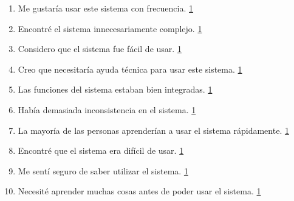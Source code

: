 \documentclass[letterpaper, 12pt]{article}
\begin{document}
\begin{enumerate}[label=\textbf{\arabic*.}]
    \item Me gustaría usar este sistema con frecuencia. \hfill \underline{1    }
    \item Encontré el sistema innecesariamente complejo. \hfill \underline{1    }
    \item Considero que el sistema fue fácil de usar. \hfill \underline{1    }
    \item Creo que necesitaría ayuda técnica para usar este sistema. \hfill \underline{1    }
    \item Las funciones del sistema estaban bien integradas. \hfill \underline{1    }
    \item Había demasiada inconsistencia en el sistema. \hfill \underline{1    }
    \item La mayoría de las personas aprenderían a usar el sistema rápidamente. \hfill \underline{1    }
    \item Encontré que el sistema era difícil de usar. \hfill \underline{1    }
    \item Me sentí seguro de saber utilizar el sistema. \hfill \underline{1    }
    \item Necesité aprender muchas cosas antes de poder usar el sistema. \hfill \underline{1    }
\end{enumerate}
\end{document}
